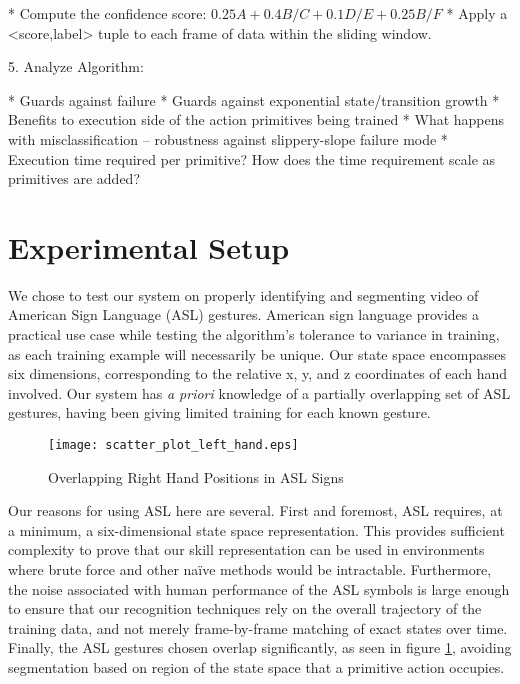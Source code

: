 \documentclass[letterpaper]{article}
\begin{document}
			* Compute the confidence score: $0.25A + 0.4B/C + 0.1D/E + 0.25B/F$
			* Apply a <score,label> tuple to each frame of data within the sliding window.



5. Analyze Algorithm:

	* Guards against failure
	* Guards against exponential state/transition growth
	* Benefits to execution side of the action primitives being trained
	* What happens with misclassification -- robustness against slippery-slope failure mode
	* Execution time required per primitive? How does the time requirement scale as primitives are added?

\section{Experimental Setup}
\label{sec:experiment}
We chose to test our system on properly identifying and segmenting video of American Sign Language (ASL) gestures. American sign language provides a practical use case while testing the algorithm's tolerance to variance in training, as each training example will necessarily be unique. Our state space encompasses six dimensions, corresponding to the relative x, y, and z coordinates of each hand involved.  Our system has \textit{a priori} knowledge of a partially overlapping set of ASL gestures, having been giving limited training for each known gesture.

\begin{figure}
\begin{center}
\texttt{[image: scatter\_plot\_left\_hand.eps]}
\caption{Overlapping Right Hand Positions in ASL Signs}
\label{fig:asl_sign_overlap}
\end{center}
\end{figure}

Our reasons for using ASL here are several.  First and foremost, ASL requires, at a minimum, a six-dimensional state space representation.  This provides sufficient complexity to prove that our skill representation can be used in environments where brute force and other na\"ive methods would be intractable.  Furthermore, the noise associated with human performance of the ASL symbols is large enough to ensure that our recognition techniques rely on the overall trajectory of the training data, and not merely frame-by-frame matching of exact states over time.  Finally, the ASL gestures chosen overlap significantly, as seen in figure \ref{fig:asl_sign_overlap}, avoiding segmentation based on region of the state space that a primitive action occupies.
\end{document}
